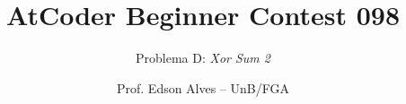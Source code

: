 \title{AtCoder Beginner Contest 098}
\subtitle{Problema D: \textit{Xor Sum 2}}
\author{Prof. Edson Alves -- UnB/FGA}
\date{}
